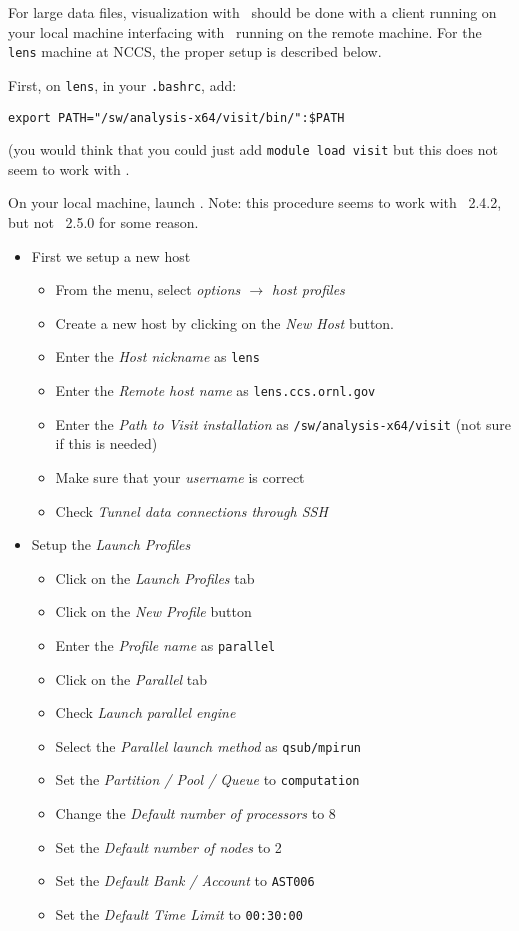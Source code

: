 For large data files, visualization with \visit\ should be done with
a client running on your local machine interfacing with \visit\ running
on the remote machine.  For the {\tt lens} machine at NCCS, the proper setup
is described below.

First, on {\tt lens}, in your {\tt .bashrc}, add:
\begin{verbatim}
export PATH="/sw/analysis-x64/visit/bin/":$PATH
\end{verbatim}
(you would think that you could just add {\tt module load visit} but this
does not seem to work with \visit.

On your local machine, launch \visit.  Note: this procedure seems to
work with \visit~2.4.2, but not \visit~2.5.0 for some reason.
\begin{itemize}
\item First we setup a new host

  \begin{itemize}
  \item From the menu, select {\em options $\rightarrow$ host profiles}
  \item Create a new host by clicking on the {\em New Host} button.
  \item Enter the {\em Host nickname} as {\tt lens}
  \item Enter the {\em Remote host name} as {\tt lens.ccs.ornl.gov}
  \item Enter the {\em Path to Visit installation} as {\tt /sw/analysis-x64/visit} (not sure if this is needed)
  \item Make sure that your {\em username} is correct
  \item Check {\em Tunnel data connections through SSH}
  \end{itemize}

\item Setup the {\em Launch Profiles}
  \begin{itemize}
  \item Click on the {\em Launch Profiles} tab
  \item Click on the {\em New Profile} button
  \item Enter the {\em Profile name} as {\tt parallel}
  \item Click on the {\em Parallel} tab
  \item Check {\em Launch parallel engine}
  \item Select the {\em Parallel launch method} as {\tt qsub/mpirun}
  \item Set the {\em Partition / Pool / Queue} to {\tt computation}
  \item Change the {\em Default number of processors} to 8
  \item Set the {\em Default number of nodes} to 2
  \item Set the {\em Default Bank / Account} to {\tt AST006}
  \item Set the {\em Default Time Limit} to {\tt 00:30:00}
  \end{itemize}


\end{itemize}
